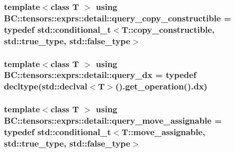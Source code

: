 \subsubsection[{\texorpdfstring{query\+\_\+copy\+\_\+constructible}{query_copy_constructible}}]{\setlength{\rightskip}{0pt plus 5cm}template$<$class T $>$ using {\bf B\+C\+::tensors\+::exprs\+::detail\+::query\+\_\+copy\+\_\+constructible} = typedef std\+::conditional\+\_\+t$<$T\+::copy\+\_\+constructible, std\+::true\+\_\+type, std\+::false\+\_\+type$>$}\hypertarget{namespaceBC_1_1tensors_1_1exprs_1_1detail_a99d9a9b5e8f7821052157b13f034f650}{}\label{namespaceBC_1_1tensors_1_1exprs_1_1detail_a99d9a9b5e8f7821052157b13f034f650}
\subsubsection[{\texorpdfstring{query\+\_\+dx}{query_dx}}]{\setlength{\rightskip}{0pt plus 5cm}template$<$class T $>$ using {\bf B\+C\+::tensors\+::exprs\+::detail\+::query\+\_\+dx} = typedef decltype(std\+::declval$<$T$>$().get\+\_\+operation().{\bf dx})}\hypertarget{namespaceBC_1_1tensors_1_1exprs_1_1detail_afce786a08d3636682dba772cadb7d251}{}\label{namespaceBC_1_1tensors_1_1exprs_1_1detail_afce786a08d3636682dba772cadb7d251}
\subsubsection[{\texorpdfstring{query\+\_\+move\+\_\+assignable}{query_move_assignable}}]{\setlength{\rightskip}{0pt plus 5cm}template$<$class T $>$ using {\bf B\+C\+::tensors\+::exprs\+::detail\+::query\+\_\+move\+\_\+assignable} = typedef std\+::conditional\+\_\+t$<$T\+::move\+\_\+assignable, std\+::true\+\_\+type, std\+::false\+\_\+type$>$}\hypertarget{namespaceBC_1_1tensors_1_1exprs_1_1detail_af69d3cdb55eeeac2b3d092f14fc2245c}{}\label{namespaceBC_1_1tensors_1_1exprs_1_1detail_af69d3cdb55eeeac2b3d092f14fc2245c}
